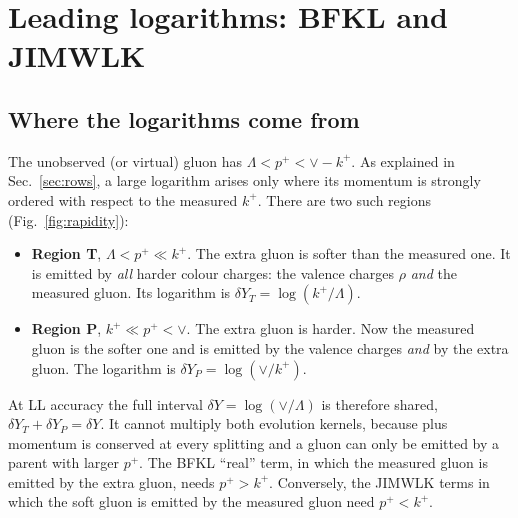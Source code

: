 \section{Leading logarithms: BFKL and JIMWLK}\label{sec:LL}

\subsection{Where the logarithms come from}\label{sec:LLorigin}

The unobserved (or virtual) gluon has $\Lambda<p^+<\vee-k^+$. As explained in Sec.~\ref{sec:rows}, a large logarithm arises only where its momentum is strongly ordered with respect to the measured $k^+$. There are two such regions (Fig.~\ref{fig:rapidity}):
\begin{itemize}
\item \textbf{Region T}, $\Lambda<p^+\ll k^+$. The extra gluon is softer than the measured one. It is emitted by \emph{all} harder colour charges: the valence charges $\rho$ \emph{and} the measured gluon. Its logarithm is $\delta Y_T=\log(k^+/\Lambda)$.
\item \textbf{Region P}, $k^+\ll p^+<\vee$. The extra gluon is harder. Now the measured gluon is the softer one and is emitted by the valence charges \emph{and} by the extra gluon. The logarithm is $\delta Y_P=\log(\vee/k^+)$.
\end{itemize}
At LL accuracy the full interval $\delta Y=\log(\vee/\Lambda)$ is therefore shared, $\delta Y_T+\delta Y_P=\delta Y$. It cannot multiply both evolution kernels, because plus momentum is conserved at every splitting and a gluon can only be emitted by a parent with larger $p^+$. The BFKL ``real'' term, in which the measured gluon is emitted by the extra gluon, needs $p^+>k^+$. Conversely, the JIMWLK terms in which the soft gluon is emitted by the measured gluon need $p^+<k^+$.


